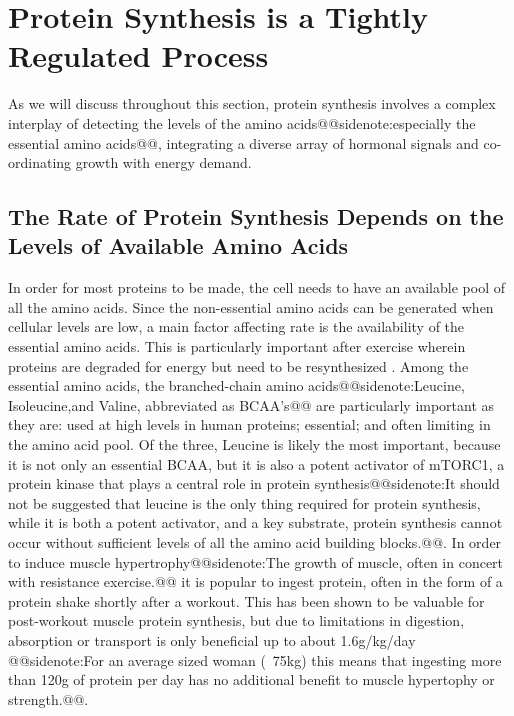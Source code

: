\documentclass{tufte-handout}
\makeatletter
\def\sidenote#1{@@sidenote:#1@@}
\makeatother
\begin{document}
\section{Protein Synthesis is a Tightly Regulated Process}

As we will discuss throughout this section, protein synthesis involves a complex interplay of detecting the levels of the amino acids\sidenote{especially the essential amino acids}, integrating a diverse array of hormonal signals and co-ordinating growth with energy demand.

\subsection{The Rate of Protein Synthesis Depends on the Levels of Available Amino Acids}

In order for most proteins to be made, the cell needs to have an available pool of all the amino acids.  Since the non-essential amino acids can be generated when cellular levels are low, a main factor affecting rate is the availability of the essential amino acids.  This is particularly important after exercise wherein proteins are degraded for energy but need to be resynthesized \citep{Tipton1999}.  Among the essential amino acids, the branched-chain amino acids\sidenote{Leucine, Isoleucine,and Valine, abbreviated as BCAA's\nomenclature{BCAA}{Branched-Chain Amino Acids}} are particularly important as they are: used at high levels in human proteins; essential; and often limiting in the amino acid pool.  Of the three, Leucine is likely the most important, because it is not only an essential BCAA, but it is also a potent activator of mTORC1, a protein kinase that plays a central role in protein synthesis\sidenote{It should not be suggested that leucine is the only thing required for protein synthesis, while it is both a potent activator, and a key substrate, protein synthesis cannot occur without sufficient levels of all the amino acid building blocks.}.   In order to induce muscle hypertrophy\sidenote{The growth of muscle, often in concert with resistance exercise.} it is popular to ingest protein, often in the form of a protein shake shortly after a workout.  This has been shown to be valuable for post-workout muscle protein synthesis, but due to limitations in digestion, absorption or transport is only beneficial up to about 1.6g/kg/day \citep{Morton2017}\sidenote{For an average sized woman (~75kg) this means that ingesting more than 120g of protein per day has no additional benefit to muscle hypertophy or strength.}.
\end{document}
